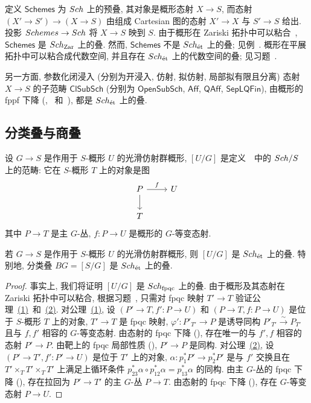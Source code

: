 \begin{example}[概形的叠]\label{src:3.5.12}
定义 $\mathsf{Schemes}$ 为 $Sch$ 上的预叠, 其对象是概形态射 $X\to S$, 而态射 $(X'\to S')\to(X\to S)$ 由组成 Cartesian 图的态射 $X'\to X$ 与 $S'\to S$ 给出. 投影 $Schemes\to Sch$ 将 $X\to S$ 映到 $S$. 由于概形在 Zariski 拓扑中可以粘合~\cite[习题 II.2.12]{Har77}, $\mathsf{Schemes}$ 是 $Sch_{\mathrm{Zar}}$ 上的叠. 然而, $\mathsf{Schemes}$ 不是 $Sch_{\text{ét}}$ 上的叠; 见例~. 概形在平展拓扑中可以粘合成代数空间, 并且存在 $Sch_{\text{ét}}$ 上的代数空间的叠; 见习题~.

另一方面, 参数化闭浸入 (分别为开浸入, 仿射, 拟仿射, 局部拟有限且分离) 态射 $X\to S$ 的子范畴 $\mathsf{ClSubSch}$ (分别为 $\mathsf{OpenSubSch}$, $\mathsf{Aff}$, $\mathsf{QAff}$, $\mathsf{SepLQFin}$), 由概形的 fppf 下降 (, ~和~), 都是 $Sch_{\text{ét}}$ 上的叠.
\end{example}

\subsection{分类叠与商叠}\label{src:3.5.3-subsection}
设 $G\to S$ 是作用于 $S$-概形 $U$ 的光滑仿射群概形, $[U/G]$ 是定义~~中的 $Sch/S$ 上的范畴: 它在 $S$-概形 $T$ 上的对象是图
\[
\begin{tikzcd}
P\arrow[r,"f"]\arrow[d]&U\\
T&
\end{tikzcd}
\]
其中 $P\to T$ 是主 $G$-丛, $f:P\to U$ 是概形的 $G$-等变态射.
\begin{proposition}\label{src:3.5.13}
若 $G\to S$ 是作用于 $S$-概形 $U$ 的光滑仿射群概形, 则 $[U/G]$ 是 $Sch_{\text{ét}}$ 上的叠. 特别地, 分类叠 $BG=[S/G]$ 是 $Sch_{\text{ét}}$ 上的叠.
\end{proposition}
\begin{proof}
事实上, 我们将证明 $[U/G]$ 是 $Sch_{\mathrm{fpqc}}$ 上的叠. 由于概形及其态射在 Zariski 拓扑中可以粘合, 根据习题~, 只需对 fpqc 映射 $T'\to T$ 验证公理~\hyperlink{stack-axiom-1}{(1)}~和~\hyperlink{stack-axiom-2}{(2)}.
对公理~\hyperlink{stack-axiom-1}{(1)}, 设 $(P'\to T,f':P\to U)$ 和 $(P\to T,f:P\to U)$ 是位于 $S$-概形 $T$ 上的对象, $T'\to T$ 是 fpqc 映射, $\varphi':P'_{T'}\to P$ 是诱导同构 $P'_{T'}\xrightarrow{\sim}P_{T'}$ 且与 $f,f'$ 相容的 $G$-等变态射. 由态射的 fpqc 下降 (), 存在唯一的与 $f',f$ 相容的态射 $P'\to P$. 由靶上的 fpqc 局部性质 (), $P'\to P$ 是同构.
对公理~\hyperlink{stack-axiom-2}{(2)}, 设 $(P'\to T',f':P'\to U)$ 是位于 $T'$ 上的对象, $\alpha:p_1^*P'\to p_2^*P'$ 是与 $f'$ 交换且在 $T'\times_T T'\times_T T'$ 上满足上循环条件 $p_{23}^*\alpha\circ p_{12}^*\alpha=p_{13}^*\alpha$ 的同构. 由主 $G$-丛的 fpqc 下降 (), 存在拉回为 $P'\to T'$ 的主 $G$-丛 $P\to T$. 由态射的 fpqc 下降 (), 存在 $G$-等变态射 $P\to U$.
\end{proof}


